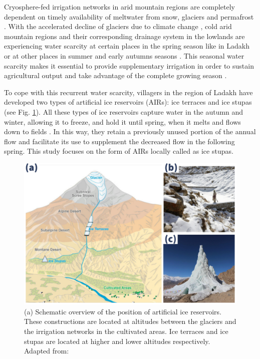 \documentclass[tc, manuscript]{copernicus}
\begin{document}
\introduction

Cryosphere-fed irrigation networks in arid mountain regions are completely dependent on timely availability of
meltwater from snow, glaciers and permafrost \citep{immerzeelImportanceVulnerabilityWorld2020, farhanHydrologicalRegimesConjunction2015,
tveitenGlacierGrowingLocal2007}. With the accelerated decline of glaciers due to climate change
\citep{nusserLocalKnowledgeGlobal2016}, cold arid mountain regions and their corresponding drainage system in the lowlands are experiencing water scarcity at certain places in the spring season like in Ladakh \citep{norphelSnowWaterHarvesting2015} or at other places in summer and early autumns seasons . This seasonal water scarcity makes it essential to provide
supplementary irrigation in order to sustain agricultural output and take advantage of the complete growing
season \citep{nusserLocalKnowledgeGlobal2016, vincentEnergyClimateChange2009}.

To cope with this recurrent water scarcity, villagers in the region of Ladakh have developed two types of
artificial ice reservoirs (AIRs): ice terraces and ice stupas (see Fig. \ref{fig:AIRforms}).  All these types of
ice reservoirs capture water in the autumn and winter, allowing it to freeze, and hold it until spring, when it
melts and flows down to fields \citep{ipccChapterHighMountain2019, vinceGlacierMan2009,
clouseLadakhArtificialGlaciers2017, nusserSociohydrologyArtificialGlaciers2019}. In this way, they retain a
previously unused portion of the annual flow and facilitate its use to supplement the decreased flow in the
following spring. This study focuses on the form of AIRs locally called as ice stupas.

\begin{figure}[t]
\includegraphics[width=12cm]{Figures/AIR_forms.jpg}

\caption{(a) Schematic overview of the position of artificial ice reservoirs. These constructions are located at
altitudes between the glaciers and the irrigation networks in the cultivated areas. Ice terraces and ice stupas
are located at higher and lower altitudes respectively. Adapted from: \cite{nusserLocalKnowledgeGlobal2016}}

\label{fig:AIRforms}
\end{figure}
\end{document}

